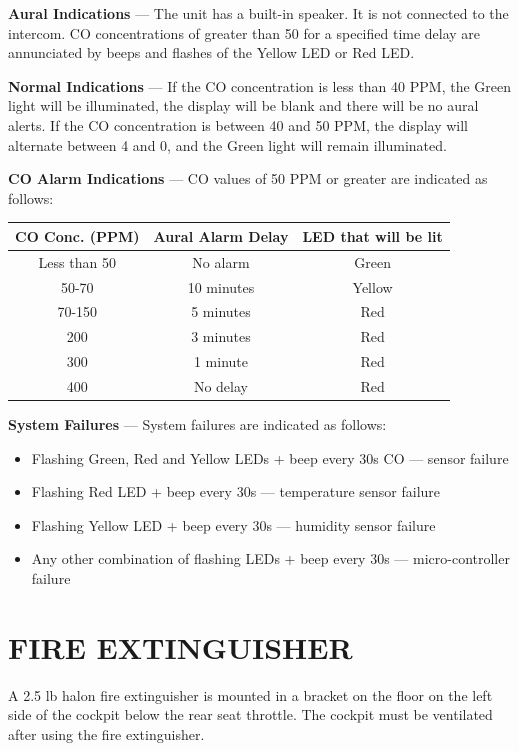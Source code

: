 \textbf{Aural Indications} --- The unit has a built-in speaker. It is not connected to the intercom. CO concentrations of greater than 50 for a specified time delay are annunciated by beeps and flashes of the Yellow LED or Red LED.


\textbf{Normal Indications} --- If the CO concentration is less than 40 PPM, the Green light will be illuminated, the display will be blank and there will be no aural alerts. If the CO concentration is between 40 and 50 PPM, the display will alternate between 4 and 0, and the Green light will remain illuminated.

\begin{minipage}{\textwidth}
\textbf{CO Alarm Indications} --- CO values of 50 PPM or greater are indicated as follows:
\begin{center}
\begin{tabular}
{|c|c|c|} \hline CO Conc. (PPM) & Aural Alarm Delay& LED that will be lit\tabularnewline \hline \hline Less than 50 & No alarm& Green\tabularnewline \hline 50-70& 10 minutes & Yellow\tabularnewline \hline 70-150 & 5 minutes& Red\tabularnewline \hline 200& 3 minutes & Red\tabularnewline \hline 300& 1 minute& Red\tabularnewline \hline 400& No delay & Red\tabularnewline \hline
\end{tabular}
\end{center}
\end{minipage}

\textbf{System Failures} --- System failures are indicated as follows:
\begin{itemize}
\item Flashing Green, Red and Yellow LEDs + beep every 30s CO --- sensor failure
\item Flashing Red LED + beep every 30s --- temperature sensor failure
\item Flashing Yellow LED + beep every 30s --- humidity sensor failure
\item Any other combination of flashing LEDs + beep every 30s --- micro-controller failure
\end{itemize}

\section{FIRE EXTINGUISHER}

A 2.5 lb halon fire extinguisher is mounted in a bracket on the floor on the left side  of the cockpit below the rear seat throttle. The cockpit must be ventilated after using the fire extinguisher.

